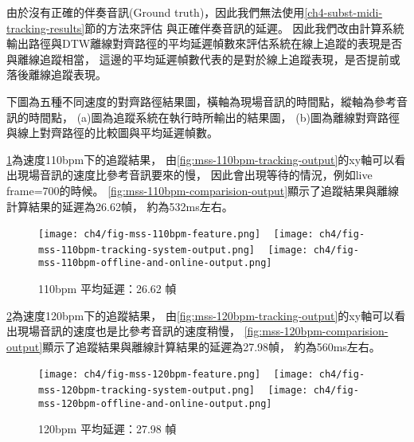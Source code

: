 \documentclass[class=NCU_thesis, crop=false]{standalone}
\begin{document}
由於沒有正確的伴奏音訊(Ground truth)，因此我們無法使用\ref{ch4-subst-midi-tracking-results}節的方法來評估
與正確伴奏音訊的延遲。
因此我們改由計算系統輸出路徑與DTW離線對齊路徑的平均延遲幀數來評估系統在線上追蹤的表現是否與離線追蹤相當，
這邊的平均延遲幀數代表的是對於線上追蹤表現，是否提前或落後離線追蹤表現。

下圖為五種不同速度的對齊路徑結果圖，橫軸為現場音訊的時間點，縱軸為參考音訊的時間點，
(a)圖為追蹤系統在執行時所輸出的結果圖，
(b)圖為離線對齊路徑與線上對齊路徑的比較圖與平均延遲幀數。

\cref{fig:fig-ch4-mss-110bpm-tracking-results}為速度110bpm下的追蹤結果，
由\cref{fig:mss-110bpm-tracking-output}的xy軸可以看出現場音訊的速度比參考音訊要來的慢，
因此會出現等待的情況，例如live frame=700的時候。
\cref{fig:mss-110bpm-comparision-output}顯示了追蹤結果與離線計算結果的延遲為26.62幀，
約為532ms左右。

\begin{figure}[H]
    \centering
    \subcaptionbox
    {
    \label{fig:mss-110bpm-feature}}
    {\texttt{[image: ch4/fig-mss-110bpm-feature.png]}}
    ~
    \subcaptionbox
    {
    \label{fig:mss-110bpm-tracking-output}}
    {\texttt{[image: ch4/fig-mss-110bpm-tracking-system-output.png]}}
    ~
    \subcaptionbox
    {
    \label{fig:mss-110bpm-comparision-output}}
    {\texttt{[image: ch4/fig-mss-110bpm-offline-and-online-output.png]}}
    \caption{110bpm 平均延遲：26.62 幀}
    \label{fig:fig-ch4-mss-110bpm-tracking-results}
\end{figure}

\cref{fig:fig-ch4-mss-120bpm-tracking-results}為速度120bpm下的追蹤結果，
由\cref{fig:mss-120bpm-tracking-output}的xy軸可以看出現場音訊的速度也是比參考音訊的速度稍慢，
\cref{fig:mss-120bpm-comparision-output}顯示了追蹤結果與離線計算結果的延遲為27.98幀，
約為560ms左右。

\begin{figure}[H]
    \centering
    \subcaptionbox
    {
    \label{fig:mss-120bpm-feature}}
    {\texttt{[image: ch4/fig-mss-120bpm-feature.png]}}
    ~
    \subcaptionbox
    {
    \label{fig:mss-120bpm-tracking-output}}
    {\texttt{[image: ch4/fig-mss-120bpm-tracking-system-output.png]}}
    ~
    \subcaptionbox
    {
    \label{fig:mss-120bpm-comparision-output}}
    {\texttt{[image: ch4/fig-mss-120bpm-offline-and-online-output.png]}}
    \caption{120bpm 平均延遲：27.98 幀}
    \label{fig:fig-ch4-mss-120bpm-tracking-results}
\end{figure}
\end{document}
